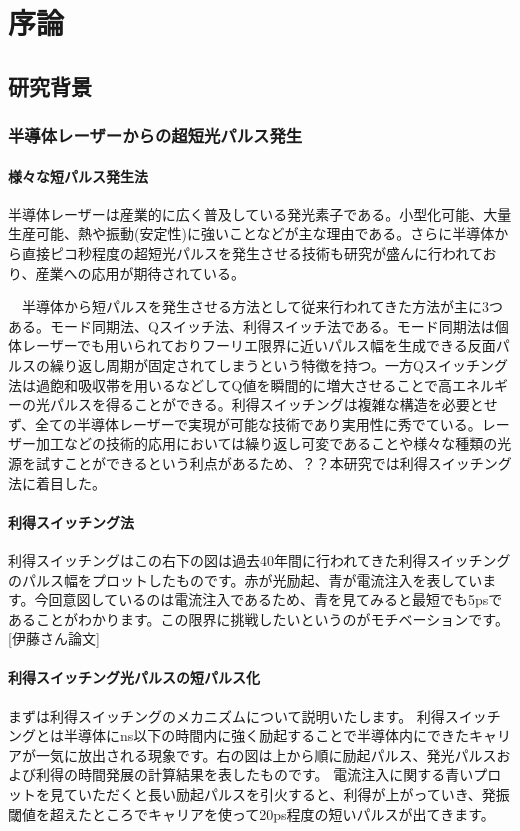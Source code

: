 \chapter{序論}
\section{研究背景}
\subsection{半導体レーザーからの超短光パルス発生}
\subsubsection{様々な短パルス発生法}
半導体レーザーは産業的に広く普及している発光素子である。小型化可能、大量生産可能、熱や振動(安定性)に強いことなどが主な理由である。さらに半導体から直接ピコ秒程度の超短光パルスを発生させる技術も研究が盛んに行われており、産業への応用が期待されている。

　半導体から短パルスを発生させる方法として従来行われてきた方法が主に3つある。モード同期法、Qスイッチ法、利得スイッチ法である。モード同期法は個体レーザーでも用いられておりフーリエ限界に近いパルス幅を生成できる反面パルスの繰り返し周期が固定されてしまうという特徴を持つ。一方Qスイッチング法は過飽和吸収帯を用いるなどしてQ値を瞬間的に増大させることで高エネルギーの光パルスを得ることができる。利得スイッチングは複雑な構造を必要とせず、全ての半導体レーザーで実現が可能な技術であり実用性に秀でている。レーザー加工などの技術的応用においては繰り返し可変であることや様々な種類の光源を試すことができるという利点があるため、？？本研究では利得スイッチング法に着目した。
\subsubsection{利得スイッチング法}
利得スイッチングはこの右下の図は過去40年間に行われてきた利得スイッチングのパルス幅をプロットしたものです。赤が光励起、青が電流注入を表しています。今回意図しているのは電流注入であるため、青を見てみると最短でも5psであることがわかります。この限界に挑戦したいというのがモチベーションです。[伊藤さん論文]
\subsubsection{利得スイッチング光パルスの短パルス化}
まずは利得スイッチングのメカニズムについて説明いたします。
利得スイッチングとは半導体にns以下の時間内に強く励起することで半導体内にできたキャリアが一気に放出される現象です。右の図は上から順に励起パルス、発光パルスおよび利得の時間発展の計算結果を表したものです。
電流注入に関する青いプロットを見ていただくと長い励起パルスを引火すると、利得が上がっていき、発振閾値を超えたところでキャリアを使って20ps程度の短いパルスが出てきます。


